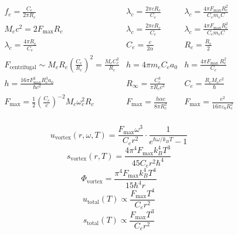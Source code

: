 \begin{gather*}
    \begin{array}{ccc}
            f_e = \frac{C_e}{2 \pi R_c} & \lambda_c = \frac{2 \pi c R_c}{C_e} & \lambda_c = \frac{4 \pi F_{\max } R_c^2}{C_e m_e C} \\
            M_e c^2 = 2 F_{\max } R_c & \lambda_c = \frac{2 \pi c R_c}{C_e} & \lambda_c = \frac{4 \pi F_{\max } R_c^2}{C_e m_e C} \\
            \lambda_c = \frac{4 \pi R_c}{C_e} & C_e = \frac{c}{2 \alpha} & R_c = \frac{R_e}{2} \\
            F_\text{centrifugal} \sim M_e R_c \left(\frac{C_e}{R_c}\right)^2 = \frac{M_e C_e^2}{R_c} & h = 4 \pi m_e C_e a_0 & h = \frac{4 \pi F_\text {max } R_e^2}{C_e} \\
            h = \frac{16 \pi F_\text{max}^2 R_c^3 a_0}{\hbar c^2} & R_\infty = \frac{C_e^3}{\pi R_c c^3} & C_e = \frac{R_c M_e c^2}{\hbar} \\
            F_{\max} = \frac{1}{2} \left( \frac{C_e}{c} \right)^{-2} M_e \omega_c^2 R_c & F_{\max} = \frac{h \alpha c}{8 \pi R_c^2} & F_{\max} = \frac{e^2}{16 \pi \varepsilon_0 R_c^2} \\
    \end{array}
\end{gather*}

\begin{equation*}
    u_\text{vortex}(r, \omega, T) = \frac{F_\text{max} \omega^3}{C_e r^2} \cdot \frac{1}{e^{\hbar \omega / k_B T} - 1}
\end{equation*}
\begin{equation*}
    s_\text{vortex}(r, T) = \frac{4 \pi^4 F_\text{max} k_B^4 T^3}{45 C_e r^2 \hbar^4}
\end{equation*}
\begin{equation*}
    \Phi_\text{vortex} = \frac{\pi^4 F_\text{max} k_B^4 T^4}{15 \hbar^4 r}
\end{equation*}
\begin{equation*}
    u_\text{total}(T) \propto \frac{F_\text{max} T^4}{C_e r^2}
\end{equation*}
\begin{equation*}
    s_\text{total}(T) \propto \frac{F_\text{max} T^3}{C_e r^2}
\end{equation*}




